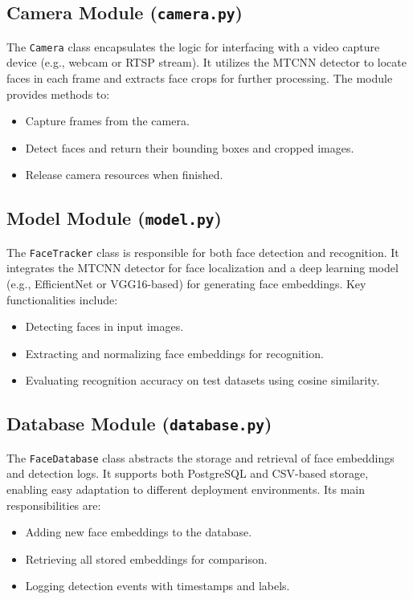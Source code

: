 \subsection{Camera Module (\texttt{camera.py})}
The \texttt{Camera} class encapsulates the logic for interfacing with a video capture device (e.g., webcam or RTSP stream). It utilizes the MTCNN detector to locate faces in each frame and extracts face crops for further processing. The module provides methods to:
\begin{itemize}
    \item Capture frames from the camera.
    \item Detect faces and return their bounding boxes and cropped images.
    \item Release camera resources when finished.
\end{itemize}

\subsection{Model Module (\texttt{model.py})}
The \texttt{FaceTracker} class is responsible for both face detection and recognition. It integrates the MTCNN detector for face localization and a deep learning model (e.g., EfficientNet or VGG16-based) for generating face embeddings. Key functionalities include:
\begin{itemize}
    \item Detecting faces in input images.
    \item Extracting and normalizing face embeddings for recognition.
    \item Evaluating recognition accuracy on test datasets using cosine similarity.
\end{itemize}

\subsection{Database Module (\texttt{database.py})}
The \texttt{FaceDatabase} class abstracts the storage and retrieval of face embeddings and detection logs. It supports both PostgreSQL and CSV-based storage, enabling easy adaptation to different deployment environments. Its main responsibilities are:
\begin{itemize}
    \item Adding new face embeddings to the database.
    \item Retrieving all stored embeddings for comparison.
    \item Logging detection events with timestamps and labels.
\end{itemize}

